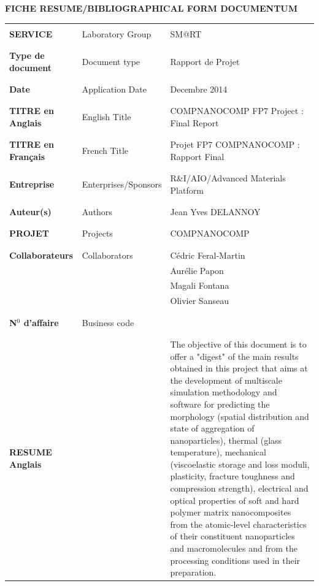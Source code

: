 \documentclass[10pt, letter]{article}
\renewcommand{\=}{\, =\, }
\newcommand{\+}{\, +\, }
\renewcommand{\-}{\, -\, }
\begin{document}
\newpage
\begin{center}
{\bf FICHE RESUME/BIBLIOGRAPHICAL FORM DOCUMENTUM}
\end{center}
\begin{flushleft}
\begin{tabular}{|l|p{}|p{}|}
\hline
&&\\
{\bf SERVICE} & Laboratory Group & SM@RT\\
&&\\ \hline &&\\
{\bf Type de document} & Document type & Rapport de Projet \\
&&\\ \hline &&\\
\bf Date & Application Date & Decembre 2014\\
&&\\ \hline &&\\
{\bf TITRE en Anglais} & English Title & COMPNANOCOMP FP7 Project : Final Report \\
&&\\ \hline &&\\
{\bf TITRE en Français} & French Title & Projet FP7 COMPNANOCOMP : Rapport Final \\
&&\\ \hline &&\\
\bf Entreprise & Enterprises/Sponsors & R$\&$I/AIO/Advanced Materials Platform  \\
&&\\ \hline &&\\
\bf Auteur(s) & Authors & Jean Yves DELANNOY \\
&&\\ \hline &&\\
\bf PROJET & Projects & COMPNANOCOMP\\
&&\\ \hline &&\\
\bf Collaborateurs & Collaborators & Cédric Feral-Martin\\
&& Aur\'elie Papon\\
&& Magali Fontana\\
&& Olivier Sanseau \\
&&\\ \hline &&\\
\bf N$^0$ d'affaire & Business code & \\
&&\\ \hline &&\\

\bf RESUME  Anglais & & The objective of this document is to offer a "digest" of the main results obtained  in this project that aims at the development of multiscale simulation methodology and software for predicting the morphology (spatial distribution and state of aggregation of nanoparticles), thermal (glass temperature), mechanical (viscoelastic storage and loss moduli, plasticity, fracture toughness and compression strength), electrical and optical properties of soft and hard polymer matrix nanocomposites from the atomic-level characteristics of their constituent nanoparticles and macromolecules and from the processing conditions used in their preparation.


\end{tabular}
\end{flushleft}
\end{document}
